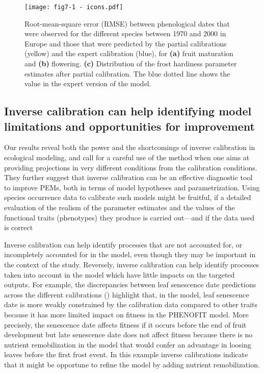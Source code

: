 \documentclass[preprint,12pt,authoryear]{elsarticle}
\begin{document}
{\begin{figure}
\centering
\begin{subcaptiongroup}
\label{fig:5A} 
\label{fig:5B}
\label{fig:5C}
\end{subcaptiongroup}
\vspace*{-1cm}
\centerline{\texttt{[image: fig7-1 - icons.pdf]}}
\caption{Root-mean-square error (RMSE) between phenological dates that were observed for the different species between 1970 and 2000 in Europe and those that were predicted by the partial calibrations (yellow) and the expert calibration (blue), for \textbf{(a)} fruit maturation and \textbf{(b)} flowering. \textbf{(c)} Distribution of the frost hardiness parameter estimates after partial calibration. The blue dotted line shows the value in the expert version of the model.}
\label{fig:5}
\end{figure}


\subsection{Inverse calibration can help identifying model limitations and opportunities for improvement}

Our results reveal both the power and the shortcomings of inverse calibration in ecological modeling, and call for a careful use of the method when one aims at providing projections in very different conditions from the calibration conditions. They further suggest that inverse calibration can be an effective diagnostic tool to improve PEMs, both in terms of model hypotheses and parametrization. Using species occurrence data to calibrate such models might be fruitful, if a detailed evaluation of the realism of the parameter estimates and the values of the functional traits (phenotypes) they produce is carried out\textcolor{customred}{---and if the data used is correct}

Inverse calibration can help identify processes that are not accounted for, or incompletely accounted for in the model, even though they may be important in the context of the study.  Reversely, inverse calibration can help identify processes taken into account in the model which have little impacts on the targeted outputs. For example, the discrepancies between leaf senescence date predictions across the different calibrations () highlight that, in the model, leaf senescence date is more weakly constrained by the calibration data compared to other traits because it has more limited impact on fitness \textcolor{customred}{in the PHENOFIT model}. More precisely, the senescence date affects fitness if it occurs before the end of fruit development but late senescence date does not affect fitness because there is no nutrient remobilization in the model that would confer an advantage in loosing leaves before the first frost event. In this example inverse calibrations indicate that it might be opportune to refine the model by adding nutrient remobilization.

}
\end{document}
